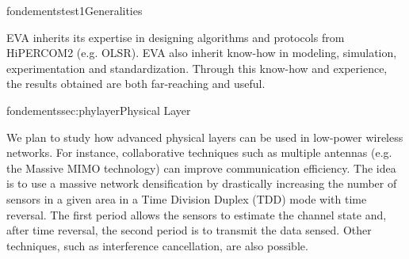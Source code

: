 \documentclass{ra2016}
\begin{document}

\begin{module}{fondements}{test1}{Generalities}

EVA inherits its expertise in designing  algorithms and protocols from HiPERCOM2 (e.g. OLSR).
EVA also inherit know-how in modeling, simulation, experimentation and standardization.
Through this know-how and experience, the results obtained are both far-reaching and useful.

\end{module}

\begin{module}{fondements}{sec:phylayer}{Physical Layer}

We plan to study how advanced physical layers can be used in low-power wireless networks.
For instance, collaborative techniques such as multiple antennas (e.g. the Massive MIMO technology) can improve communication efficiency.   
The idea is to use a massive network densification by drastically increasing the number of sensors in a given area in a Time Division Duplex (TDD) mode with time reversal.
The first period allows the sensors to estimate the channel state and, after time reversal, the second period is to transmit the data sensed.
Other techniques, such as interference cancellation, are also possible.

\end{module}
\end{document}
